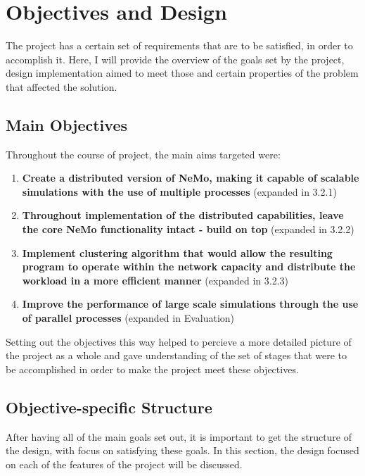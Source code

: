 \chapter{Objectives and Design}

The project has a certain set of requirements that are to be satisfied, in order to accomplish it.
Here, I will provide the overview of the goals set by the project, design implementation aimed to meet those and certain properties of the problem that affected the solution.

\section{Main Objectives}

Throughout the course of project, the main aims targeted were:

\begin{enumerate}
\item {\textbf{Create a distributed version of NeMo, making it capable of scalable simulations with the use of multiple processes} (expanded in 3.2.1)}
\item {\textbf{Throughout implementation of the distributed capabilities, leave the core NeMo functionality intact - build on top} (expanded in 3.2.2)}
\item {\textbf{Implement clustering algorithm that would allow the resulting program to operate within the network capacity and distribute the workload in a more efficient manner} (expanded in 3.2.3)}
\item {\textbf{Improve the performance of large scale simulations through the use of parallel processes} (expanded in Evaluation)}
\end{enumerate}

Setting out the objectives this way helped to percieve a more detailed picture of the project as a whole and gave understanding of the set of stages that were to be accomplished in order to
make the project meet these objectives.

\section{Objective-specific Structure}

After having all of the main goals set out, it is important to get the structure of the design, with focus on satisfying these goals. In this section, the design focused on each of the features of the project will be discussed.

